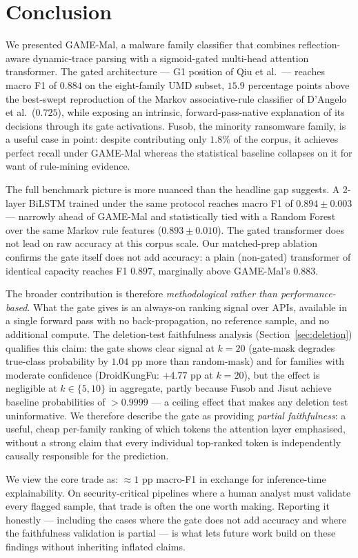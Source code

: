 \section{Conclusion}
\label{sec:conclusion}

We presented GAME-Mal, a malware family classifier that combines
reflection-aware dynamic-trace parsing with a sigmoid-gated
multi-head attention transformer. The gated architecture --- G1
position of Qiu et al.\ --- reaches macro F1 of $0.884$ on the
eight-family UMD subset, $15.9$ percentage points above the
best-swept reproduction of the Markov associative-rule classifier
of D'Angelo et al.\ ($0.725$), while exposing an intrinsic,
forward-pass-native explanation of its decisions through its gate
activations. Fusob, the minority ransomware family, is a useful
case in point: despite contributing only $1.8\%$ of the corpus,
it achieves perfect recall under GAME-Mal whereas the statistical
baseline collapses on it for want of rule-mining evidence.

The full benchmark picture is more nuanced than the headline gap
suggests. A 2-layer BiLSTM trained under the same protocol
reaches macro F1 of $0.894 \pm 0.003$ --- narrowly ahead of
GAME-Mal and statistically tied with a Random Forest over the
same Markov rule features ($0.893 \pm 0.010$). The gated
transformer does not lead on raw accuracy at this corpus scale.
Our matched-prep ablation confirms the gate itself does not
add accuracy: a plain (non-gated) transformer of identical
capacity reaches F1 $0.897$, marginally above GAME-Mal's
$0.883$.

The broader contribution is therefore \emph{methodological rather
than performance-based}. What the gate gives is an always-on
ranking signal over APIs, available in a single forward pass
with no back-propagation, no reference sample, and no additional
compute. The deletion-test faithfulness analysis
(Section~\ref{sec:deletion}) qualifies this claim: the gate
shows clear signal at $k = 20$ (gate-mask degrades true-class
probability by $1.04$ pp more than random-mask) and for families
with moderate confidence (DroidKungFu: $+4.77$ pp at $k = 20$),
but the effect is negligible at $k \in \{5, 10\}$ in aggregate,
partly because Fusob and Jisut achieve baseline probabilities
of $> 0.9999$ --- a ceiling effect that makes any deletion test
uninformative. We therefore describe the gate as providing
\emph{partial faithfulness}: a useful, cheap per-family ranking
of which tokens the attention layer emphasised, without a
strong claim that every individual top-ranked token is
independently causally responsible for the prediction.

We view the core trade as: $\approx 1$ pp macro-F1 in exchange
for inference-time explainability. On security-critical pipelines
where a human analyst must validate every flagged sample, that
trade is often the one worth making. Reporting it honestly ---
including the cases where the gate does not add accuracy and
where the faithfulness validation is partial --- is what lets
future work build on these findings without inheriting inflated
claims.
